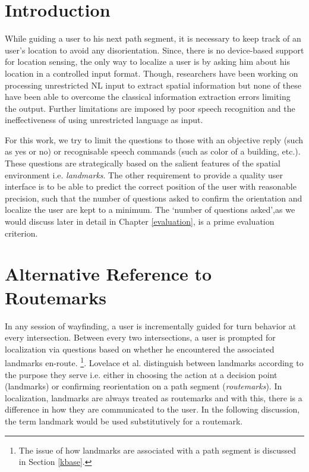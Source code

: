 \documentclass{iitkthesis}
\begin{document}
\section{Introduction} 
While guiding a user to his next path segment, it is necessary to keep track 
of an user's location to avoid any disorientation. Since, there is no 
device-based support for location sensing, the only way to localize a 
user is by asking him about his location in a controlled input format. 
Though, researchers 
\cite{tellex:language, Kordjamshidi:labelling, matuszek:following} have 
been working on processing unrestricted NL input to extract spatial 
information but none of these have been able to overcome the classical 
information extraction errors limiting the output. Further limitations 
are imposed by poor speech recognition and the ineffectiveness of using 
unrestricted language as input.
 
For this work, we try to limit the questions to those with an objective 
reply (such as yes or no) or recognisable speech commands (such as color 
of a building, etc.). These questions are strategically based on the 
salient features of the spatial environment i.e. \textit{landmarks}. The 
other requirement to provide a quality user interface is to be able to 
predict the correct position of the user with reasonable precision, 
such that the number of questions asked to confirm the orientation and 
localize the user are kept to a minimum. The `number of questions asked',as 
we would discuss later in detail in Chapter \ref{evaluation}, is a 
prime evaluation criterion.

\section{Alternative Reference to Routemarks}
\label{sec:altref}
In any session of wayfinding, a user is incrementally guided for turn 
behavior at every intersection. Between every two intersections, a user is 
prompted for localization via questions based on whether he encountered 
the associated landmarks en-route. \footnote{The issue of how landmarks 
are associated with a path segment is discussed in Section \ref{kbase}.}. 
Lovelace et al. \cite{lovelace} distinguish between landmarks 
according to the purpose they serve i.e. either in choosing the action at 
a decision point (landmarks) or confirming reorientation on a path 
segment (\textit{routemarks}). In localization, landmarks are always 
treated as routemarks and with this, there is a difference in how they 
are communicated to the user. In the following discussion, the term 
landmark would be used substitutively for a routemark. 
\end{document}

